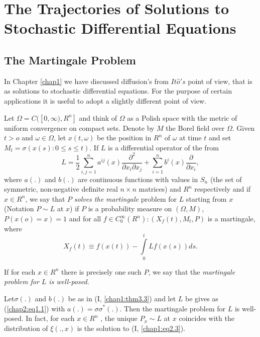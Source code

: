 

\chapter[The Trajectories of Solutions to Stochastic....]{The Trajectories of Solutions to Stochastic Differential
  Equations}%

\section{The Martingale Problem}\pageoriginale%
 
In Chapter \ref{chap1} we have discussed diffusion's from $It \hat{o}'s$ point
of view, that is as solutions to stochastic differential
equations. For the purpose of certain applications it is useful to
adopt a slightly different point of view. 

Let $\Omega =C([ 0, \infty), R^n]$ and think of $\Omega$ as a Polish
space with the metric of uniform convergence on compact sets. Denote
by $M$ the Borel field over $\Omega$. Given $t > o$ and $\omega \in
\Omega$, let $x (t,\omega)$ be the position in $R^n$ of $\omega$ at
time $t$ and set $M_t = \sigma (x(s): 0 \leq s \leq t)$.  If $L$ is a
differential operator of the from 
\begin{equation*}
L = \frac{1}{2}\sum^{n}_{i, j=1}a^{ij}(x)\frac{\partial^2}{\partial
  x_i \partial x_j}+ \sum^{n}_{i=1}b^i (x)\frac{\partial} {\partial
  x_i}, \tag{1.1}\label{chap2:eq1.1} 
\end{equation*}
where $a(.)$ and $b(.)$ are continuous functions with values in
$S_n$ (the set of symmetric, non-negative definite real $n \times n$ matrices)
and $R^n$ respectively and if $x \in R^n$, we say that $P$
\textit{solves the martingale} problem for $L$ starting from $x$
(Notation $P \sim L$ at $x$) if $P$ is a probability measure on
$(\Omega, M)$, $P(x(o)=x)=1$ and for all $f \in C^\infty_0(R^n):
(X_f(t),M_t,P)$ is a martingale, where 
$$
X_f(t)\equiv f(x(t)) - \int \limits^{t}_{0}Lf(x(s))ds. 
$$

If for each $x \in R^n$ there is precisely one such $P$, we say that
the \textit{martingale problem for $L$ is well-posed.} 


\setcounter{theorem}{1}
\begin{theorem}\label{chap2:thm1.2} %
Let\pageoriginale $\sigma(.)$ and $b(.)$ be as in (I,
\ref{chap1:thm3.3}) and let $L$ 
be gives as 
(\ref{chap2:eq1.1}) with $a(.)=\sigma \sigma^{\ast} (.)$. Then the martingale
problem for $L$ is well-posed. In fact, for each $x \in R^n$ , the
unique $P_x \sim L$ at $x$ coincides with the distribution of $\xi
(.,x)$ is the solution to (I, \ref{chap1:eq2.3}).  
\end{theorem}

